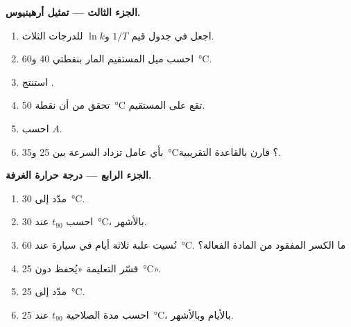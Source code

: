 \begin{problem}
\medskip
\noindent\textbf{الجزء الثالث --- تمثيل أرهينيوس.}
\begin{enumerate}[resume]
  \item اجعل في جدول قيم $1/T$ و$\ln k$ للدرجات الثلاث.
  \item احسب ميل المستقيم المار بنقطتي 40
        و\qty{60}{\celsius}.
  \item استنتج .
  \item تحقق من أن نقطة \qty{50}{\celsius} تقع على المستقيم.
  \item احسب  $A$.
  \item بأي عامل تزداد السرعة بين 25
        و\qty{35}{\celsius}؟ قارن بالقاعدة التقريبية.
\end{enumerate}

\medskip
\noindent\textbf{الجزء الرابع --- درجة حرارة الغرفة.}
\begin{enumerate}[resume]
  \item مدّد  إلى \qty{30}{\celsius}.
  \item احسب $t_{90}$ عند \qty{30}{\celsius}، بالأشهر.
  \item نُسيت علبة ثلاثة أيام في سيارة عند \qty{60}{\celsius}. ما
        الكسر المفقود من المادة الفعالة؟
  \item فسّر التعليمة «يُحفظ دون \qty{25}{\celsius}».
  \item مدّد  إلى \qty{25}{\celsius}.
  \item احسب مدة الصلاحية $t_{90}$ عند \qty{25}{\celsius}، بالأيام
        وبالأشهر.
\end{enumerate}
\end{problem}
